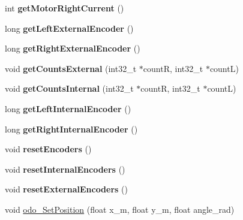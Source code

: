 \begin{DoxyCompactItemize}
int {\bfseries get\+Motor\+Right\+Current} ()
\item 
\mbox{\label{classAsservDriver__mbed__i2c_a6a504d792e80a44a864101f83bb5dce1}} 
long {\bfseries get\+Left\+External\+Encoder} ()
\item 
\mbox{\label{classAsservDriver__mbed__i2c_a86926ab53ddeab4990f91dfb0e360c83}} 
long {\bfseries get\+Right\+External\+Encoder} ()
\item 
\mbox{\label{classAsservDriver__mbed__i2c_acc6f0e2c5702fa72e786c778aec570e2}} 
void {\bfseries get\+Counts\+External} (int32\+\_\+t $\ast$countR, int32\+\_\+t $\ast$countL)
\item 
\mbox{\label{classAsservDriver__mbed__i2c_a569f45a1cd9bea41c1f5359c056f1d5c}} 
void {\bfseries get\+Counts\+Internal} (int32\+\_\+t $\ast$countR, int32\+\_\+t $\ast$countL)
\item 
\mbox{\label{classAsservDriver__mbed__i2c_aa8167b057da35e0bf2cc6a13b095bea0}} 
long {\bfseries get\+Left\+Internal\+Encoder} ()
\item 
\mbox{\label{classAsservDriver__mbed__i2c_aab6bff31b83fabf90258babb30dbad43}} 
long {\bfseries get\+Right\+Internal\+Encoder} ()
\item 
\mbox{\label{classAsservDriver__mbed__i2c_a753fe6e7fb50f41755963372e970b852}} 
void {\bfseries reset\+Encoders} ()
\item 
\mbox{\label{classAsservDriver__mbed__i2c_a176492e47baf0c068b5936ac871637d3}} 
void {\bfseries reset\+Internal\+Encoders} ()
\item 
\mbox{\label{classAsservDriver__mbed__i2c_ae1f1bdfbaa409cedc511dce227c2bf3f}} 
void {\bfseries reset\+External\+Encoders} ()
\item 
\mbox{\label{classAsservDriver__mbed__i2c_aa24966587d78fbf770e8cdd9e4d74f4f}} 
void \hyperlink{classAsservDriver__mbed__i2c_aa24966587d78fbf770e8cdd9e4d74f4f}{odo\+\_\+\+Set\+Position} (float x\+\_\+m, float y\+\_\+m, float angle\+\_\+rad)

\end{DoxyCompactItemize}
